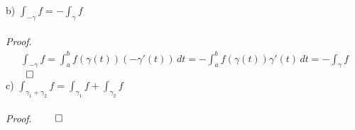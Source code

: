 \documentclass[12pt]{article}
\begin{document}
\noindent b) $\int_{-\gamma} f = -\int_{\gamma} f$ \\ \\
{\em Proof}.
\begin{align*}
\int_{-\gamma} f = \int_a^b f(\gamma(t)) (-\gamma'(t)) \, dt = - \int_a^b f(\gamma(t)) \gamma'(t) \, dt = -\int_{\gamma} f
\end{align*}
$\hfill \qed$ \\

\noindent c) $\int_{\gamma_1 + \gamma_2} f = \int_{\gamma_1} f + \int_{\gamma_2} f$ \\ \\ 
{\em Proof}.
$\hfill \qed$ 
\end{document}
